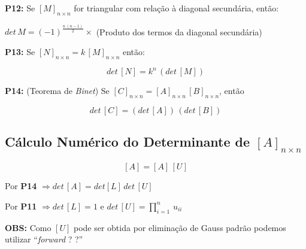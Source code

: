 \textbf{P12:} Se $[M]_{n \times n}$ for triangular com relação à diagonal secundária, então:

\begin{center}
 $det \, M = (-1)^{ \displaystyle \frac{n \, (n - 1)}{2}} \times $ (Produto dos termos da diagonal secundária)
\end{center}

\textbf{P13:} Se $[N]_{n \times n} = k \, [M]_{n \times n}$ então:

\[
 det \, [N] = k^n \, (det \, [M])
\]

\textbf{P14:} (Teorema de \textit{Binet}) Se $[C]_{n \times n} = [A]_{n \times n} \, [B]_{n \times n}$, então

\[
 det \, [C] = (det \, [A]) \, (det \, [B])
\]

\subsection{Cálculo Numérico do Determinante de $[A]_{n \times n}$}

\[
 [A] = [A] \, [U]
\]

\begin{center}
 Por \textbf{P14} $\Rightarrow det \, [A] = det [L] \, det \, [U]$
\end{center}

\begin{center}
 Por \textbf{P11} $\Rightarrow det \, [L] = 1$ e $det \, [U] = \displaystyle \prod_{i=1}^n \, u_{ii}$
\end{center}

\textbf{OBS:} Como $[U]$ pode ser obtida por eliminação de Gauss padrão podemos utilizar ``\textit{forward} ? ?''